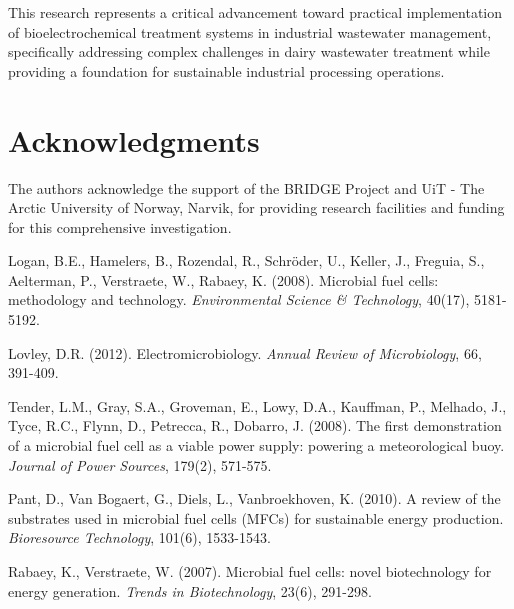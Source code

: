 \documentclass[12pt,a4paper]{article}
\begin{document}
This research represents a critical advancement toward practical implementation of bioelectrochemical treatment systems in industrial wastewater management, specifically addressing complex challenges in dairy wastewater treatment while providing a foundation for sustainable industrial processing operations.

\section*{Acknowledgments}

The authors acknowledge the support of the BRIDGE Project and UiT - The Arctic University of Norway, Narvik, for providing research facilities and funding for this comprehensive investigation.

\begin{thebibliography}{99}

Logan, B.E., Hamelers, B., Rozendal, R., Schröder, U., Keller, J., Freguia, S., Aelterman, P., Verstraete, W., Rabaey, K. (2008). Microbial fuel cells: methodology and technology. \textit{Environmental Science \& Technology}, 40(17), 5181-5192.

Lovley, D.R. (2012). Electromicrobiology. \textit{Annual Review of Microbiology}, 66, 391-409.

Tender, L.M., Gray, S.A., Groveman, E., Lowy, D.A., Kauffman, P., Melhado, J., Tyce, R.C., Flynn, D., Petrecca, R., Dobarro, J. (2008). The first demonstration of a microbial fuel cell as a viable power supply: powering a meteorological buoy. \textit{Journal of Power Sources}, 179(2), 571-575.

Pant, D., Van Bogaert, G., Diels, L., Vanbroekhoven, K. (2010). A review of the substrates used in microbial fuel cells (MFCs) for sustainable energy production. \textit{Bioresource Technology}, 101(6), 1533-1543.

Rabaey, K., Verstraete, W. (2007). Microbial fuel cells: novel biotechnology for energy generation. \textit{Trends in Biotechnology}, 23(6), 291-298.

\end{thebibliography}
\end{document}
